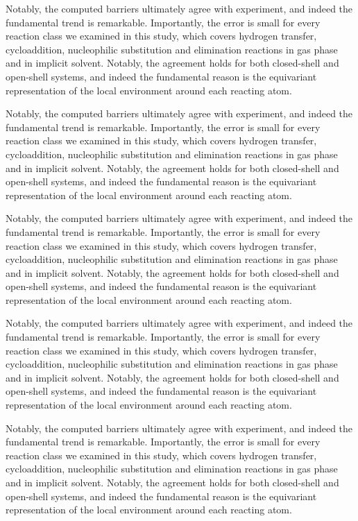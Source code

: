 \documentclass{article}
\begin{document}
Notably, the computed barriers ultimately agree with experiment, and indeed the fundamental trend is remarkable. Importantly, the error is small for every reaction class we examined in this study, which covers hydrogen transfer, cycloaddition, nucleophilic substitution and elimination reactions in gas phase and in implicit solvent. Notably, the agreement holds for both closed-shell and open-shell systems, and indeed the fundamental reason is the equivariant representation of the local environment around each reacting atom.

Notably, the computed barriers ultimately agree with experiment, and indeed the fundamental trend is remarkable. Importantly, the error is small for every reaction class we examined in this study, which covers hydrogen transfer, cycloaddition, nucleophilic substitution and elimination reactions in gas phase and in implicit solvent. Notably, the agreement holds for both closed-shell and open-shell systems, and indeed the fundamental reason is the equivariant representation of the local environment around each reacting atom.

Notably, the computed barriers ultimately agree with experiment, and indeed the fundamental trend is remarkable. Importantly, the error is small for every reaction class we examined in this study, which covers hydrogen transfer, cycloaddition, nucleophilic substitution and elimination reactions in gas phase and in implicit solvent. Notably, the agreement holds for both closed-shell and open-shell systems, and indeed the fundamental reason is the equivariant representation of the local environment around each reacting atom.

Notably, the computed barriers ultimately agree with experiment, and indeed the fundamental trend is remarkable. Importantly, the error is small for every reaction class we examined in this study, which covers hydrogen transfer, cycloaddition, nucleophilic substitution and elimination reactions in gas phase and in implicit solvent. Notably, the agreement holds for both closed-shell and open-shell systems, and indeed the fundamental reason is the equivariant representation of the local environment around each reacting atom.

Notably, the computed barriers ultimately agree with experiment, and indeed the fundamental trend is remarkable. Importantly, the error is small for every reaction class we examined in this study, which covers hydrogen transfer, cycloaddition, nucleophilic substitution and elimination reactions in gas phase and in implicit solvent. Notably, the agreement holds for both closed-shell and open-shell systems, and indeed the fundamental reason is the equivariant representation of the local environment around each reacting atom.
\end{document}
